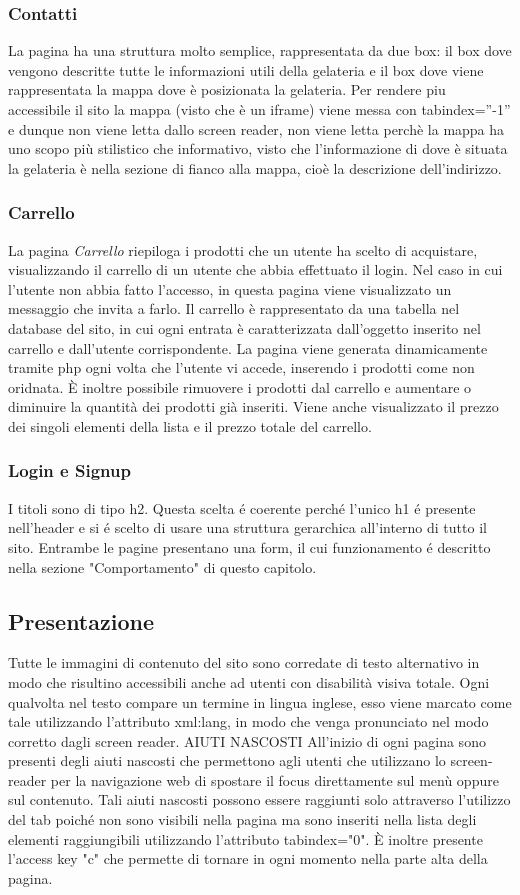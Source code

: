 		\subsubsection{Contatti}
			La pagina ha una struttura molto semplice, rappresentata da due box: il box dove vengono descritte tutte le informazioni utili della gelateria e il box dove viene rappresentata la mappa dove è posizionata la gelateria.
			Per rendere piu accessibile il sito la mappa (visto che è un iframe) viene messa con tabindex=”-1” e dunque non viene letta dallo screen reader, non viene letta perchè la mappa ha uno scopo più stilistico che informativo, visto che l'informazione di dove è situata la gelateria è nella sezione di fianco alla mappa, cioè la descrizione dell'indirizzo.
		\subsubsection{Carrello}
			La pagina \emph{Carrello} riepiloga i prodotti che un utente ha scelto di acquistare, visualizzando il carrello di un utente che abbia effettuato il login.
			Nel caso in cui l'utente non abbia fatto l'accesso, in questa pagina viene visualizzato un messaggio che invita a farlo.
			Il carrello è rappresentato da una tabella nel database del sito, in cui ogni entrata è caratterizzata dall'oggetto inserito nel carrello e dall'utente corrispondente. La pagina viene generata dinamicamente tramite php ogni volta che l'utente vi accede, inserendo i prodotti come non oridnata. È inoltre possibile rimuovere i prodotti dal carrello e aumentare o diminuire la quantità dei prodotti già inseriti.
			Viene anche visualizzato il prezzo dei singoli elementi della lista e il prezzo totale del carrello.
		\subsubsection{Login e Signup}
			I titoli sono di tipo h2.
			Questa scelta \'e coerente  perch\'e l'unico h1 \'e presente nell'header e si \'e scelto di usare una struttura gerarchica all'interno di tutto il sito.
			Entrambe le pagine presentano una form, il cui funzionamento \'e descritto nella sezione "Comportamento" di questo capitolo.
    \subsection{Presentazione}
		Tutte le immagini di contenuto del sito sono corredate di testo alternativo in modo che risultino accessibili anche ad utenti con disabilità visiva totale.
		Ogni qualvolta nel testo compare un termine in lingua inglese, esso viene marcato come tale utilizzando l'attributo xml:lang, in modo che venga pronunciato nel modo corretto dagli screen reader.
		AIUTI NASCOSTI
		All'inizio di ogni pagina sono presenti degli aiuti nascosti che permettono agli utenti che utilizzano lo screen-reader per la navigazione web di spostare il focus direttamente sul menù oppure sul contenuto.
		Tali aiuti nascosti possono essere raggiunti solo attraverso l'utilizzo del tab poiché non sono visibili nella pagina ma sono inseriti nella lista degli elementi raggiungibili utilizzando l'attributo tabindex="0".
		È inoltre presente l'access key "c" che permette di tornare in ogni momento nella parte alta della pagina.

